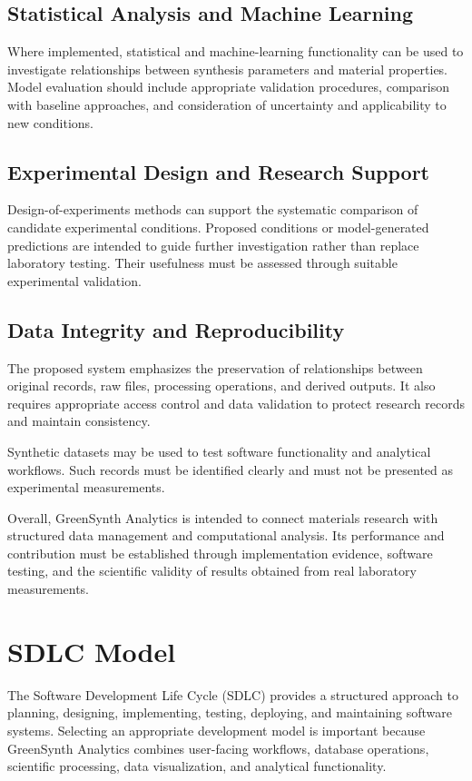 \documentclass[12pt,a4paper,oneside]{report}
\begin{document}
{{{\subsection{Statistical Analysis and Machine Learning}
Where implemented, statistical and machine-learning functionality can be used to investigate relationships between synthesis parameters and material properties. Model evaluation should include appropriate validation procedures, comparison with baseline approaches, and consideration of uncertainty and applicability to new conditions.

\subsection{Experimental Design and Research Support}
Design-of-experiments methods can support the systematic comparison of candidate experimental conditions. Proposed conditions or model-generated predictions are intended to guide further investigation rather than replace laboratory testing. Their usefulness must be assessed through suitable experimental validation.

\subsection{Data Integrity and Reproducibility}
The proposed system emphasizes the preservation of relationships between original records, raw files, processing operations, and derived outputs. It also requires appropriate access control and data validation to protect research records and maintain consistency.

Synthetic datasets may be used to test software functionality and analytical workflows. Such records must be identified clearly and must not be presented as experimental measurements.

Overall, GreenSynth Analytics is intended to connect materials research with structured data management and computational analysis. Its performance and contribution must be established through implementation evidence, software testing, and the scientific validity of results obtained from real laboratory measurements.

\section{SDLC Model}

The Software Development Life Cycle (SDLC) provides a structured approach to planning, designing, implementing, testing, deploying, and maintaining software systems. Selecting an appropriate development model is important because GreenSynth Analytics combines user-facing workflows, database operations, scientific processing, data visualization, and analytical functionality.

}}}
\end{document}
